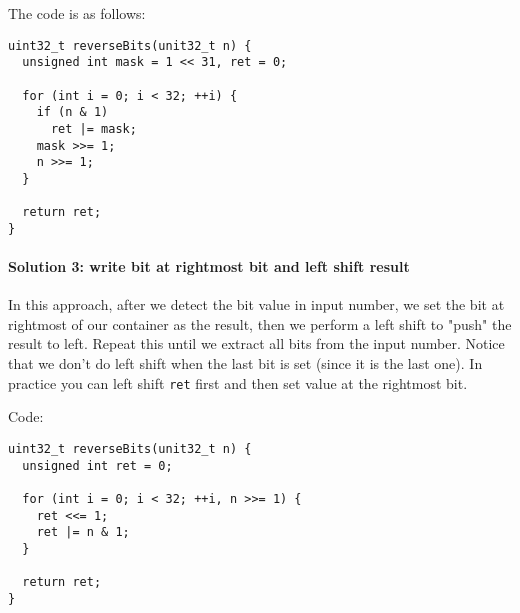 \documentclass[12pt]{article}
\begin{document}
The code is as follows:
\begin{verbatim}
uint32_t reverseBits(unit32_t n) {
  unsigned int mask = 1 << 31, ret = 0;

  for (int i = 0; i < 32; ++i) {
    if (n & 1)
      ret |= mask;
    mask >>= 1;
    n >>= 1;
  }

  return ret;
}
\end{verbatim}
\paragraph{Solution 3: write bit at rightmost bit and left shift result}
\label{sec:org137c318}
In this approach, after we detect the bit value in input number, we set the bit at rightmost of our container as the result, then we perform a left shift to "push" the result to left. Repeat this until we extract all bits from the input number. Notice that we don't do left shift when the last bit is set (since it is the last one). In practice you can left shift \texttt{ret} first and then set value at the rightmost bit.

Code:
\begin{verbatim}
uint32_t reverseBits(unit32_t n) {
  unsigned int ret = 0;

  for (int i = 0; i < 32; ++i, n >>= 1) {
    ret <<= 1;
    ret |= n & 1;
  }

  return ret;
}
\end{verbatim}
\end{document}
